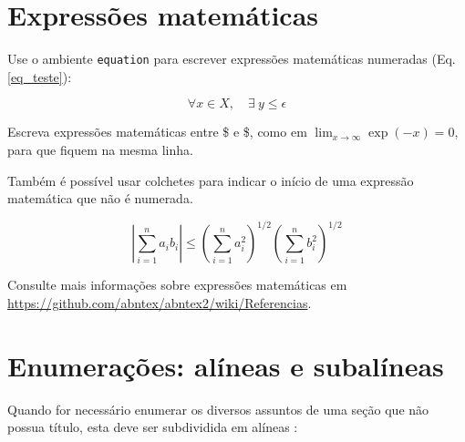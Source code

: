 \section{Expressões matemáticas}

Use o ambiente \texttt{equation} para escrever
expressões matemáticas numeradas (Eq. \ref{eq_teste}):

\begin{equation}\label{eq_teste}
  \forall x \in X, \quad \exists \: y \leq \epsilon
\end{equation}

Escreva expressões matemáticas entre \$ e \$, como em $ \lim_{x \to \infty}
\exp(-x) = 0 $, para que fiquem na mesma linha.

Também é possível usar colchetes para indicar o início de uma expressão
matemática que não é numerada.

\[
\left|\sum_{i=1}^n a_ib_i\right|
\le
\left(\sum_{i=1}^n a_i^2\right)^{1/2}
\left(\sum_{i=1}^n b_i^2\right)^{1/2}
\]

Consulte mais informações sobre expressões matemáticas em
\url{https://github.com/abntex/abntex2/wiki/Referencias}.

\section{Enumerações: alíneas e subalíneas}

Quando for necessário enumerar
os diversos assuntos de uma seção que não possua título, esta deve ser
subdividida em alíneas \cite[4.2]{NBR6024:2012}:

